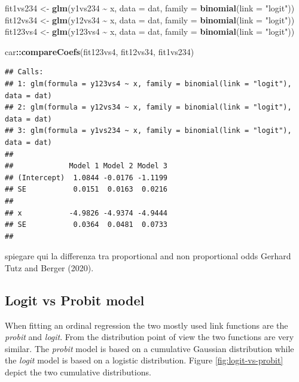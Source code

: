\documentclass[
  man,floatsintext]{apa6}
\newenvironment{Shaded}{\begin{snugshade}}{\end{snugshade}}
\newcommand{\AttributeTok}[1]{\textcolor[rgb]{0.13,0.29,0.53}{#1}}
\newcommand{\FunctionTok}[1]{\textcolor[rgb]{0.13,0.29,0.53}{\textbf{#1}}}
\newcommand{\NormalTok}[1]{#1}
\newcommand{\OtherTok}[1]{\textcolor[rgb]{0.56,0.35,0.01}{#1}}
\newcommand{\SpecialCharTok}[1]{\textcolor[rgb]{0.81,0.36,0.00}{\textbf{#1}}}
\newcommand{\StringTok}[1]{\textcolor[rgb]{0.31,0.60,0.02}{#1}}
\begin{document}
\begin{Shaded}
\begin{Highlighting}[]
\NormalTok{fit1vs234 }\OtherTok{\textless{}{-}} \FunctionTok{glm}\NormalTok{(y1vs234 }\SpecialCharTok{\textasciitilde{}}\NormalTok{ x, }\AttributeTok{data =}\NormalTok{ dat, }\AttributeTok{family =} \FunctionTok{binomial}\NormalTok{(}\AttributeTok{link =} \StringTok{"logit"}\NormalTok{))}
\NormalTok{fit12vs34 }\OtherTok{\textless{}{-}} \FunctionTok{glm}\NormalTok{(y12vs34 }\SpecialCharTok{\textasciitilde{}}\NormalTok{ x, }\AttributeTok{data =}\NormalTok{ dat, }\AttributeTok{family =} \FunctionTok{binomial}\NormalTok{(}\AttributeTok{link =} \StringTok{"logit"}\NormalTok{))}
\NormalTok{fit123vs4 }\OtherTok{\textless{}{-}} \FunctionTok{glm}\NormalTok{(y123vs4 }\SpecialCharTok{\textasciitilde{}}\NormalTok{ x, }\AttributeTok{data =}\NormalTok{ dat, }\AttributeTok{family =} \FunctionTok{binomial}\NormalTok{(}\AttributeTok{link =} \StringTok{"logit"}\NormalTok{))}

\NormalTok{car}\SpecialCharTok{::}\FunctionTok{compareCoefs}\NormalTok{(fit123vs4, fit12vs34, fit1vs234)}
\end{Highlighting}
\end{Shaded}

\begin{verbatim}
## Calls:
## 1: glm(formula = y123vs4 ~ x, family = binomial(link = "logit"), data = dat)
## 2: glm(formula = y12vs34 ~ x, family = binomial(link = "logit"), data = dat)
## 3: glm(formula = y1vs234 ~ x, family = binomial(link = "logit"), data = dat)
## 
##             Model 1 Model 2 Model 3
## (Intercept)  1.0844 -0.0176 -1.1199
## SE           0.0151  0.0163  0.0216
##                                    
## x           -4.9826 -4.9374 -4.9444
## SE           0.0364  0.0481  0.0733
## 
\end{verbatim}

spiegare qui la differenza tra proportional and non proportional odds Gerhard Tutz and Berger (2020).

\subsection{Logit vs Probit model}\label{logit-vs-probit-model}

When fitting an ordinal regression the two mostly used link functions are the \emph{probit} and \emph{logit}. From the distribution point of view the two functions are very similar. The \emph{probit} model is based on a cumulative Gaussian distribution while the \emph{logit} model is based on a logistic distribution. Figure \ref{fig:logit-vs-probit} depict the two cumulative distributions.
\end{document}
